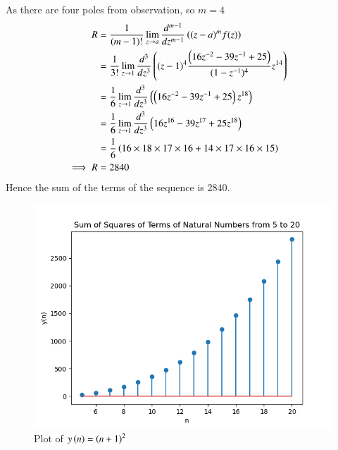 \documentclass[journal,12pt,twocolumn]{IEEEtran}
\theoremstyle{remark}
\begin{document}
As there are four poles from observation, so $m=4$
\begin{align}
    R &= \frac{1}{(m-1)!} \lim_{z \to a} \frac{d^{m-1}}{dz^{m-1}}\left((z-a)^mf(z)\right)\\
    &= \frac{1}{3!} \lim_{z \to 1} \frac{d^{3}}{dz^{3}}\left((z-1)^4 \frac{\left(16z^{-2}-39z^{-1}+25\right)}{(1-z^{-1})^4} z^{14}\right)\\
    &= \frac{1}{6} \lim_{z \to 1} \frac{d^{3}}{dz^{3}}\left(\left(16z^{-2}-39z^{-1}+25\right)z^{18}\right)\\
    &= \frac{1}{6} \lim_{z \to 1} \frac{d^{3}}{dz^{3}}\left(16z^{16}-39z^{17}+25z^{18}\right)\\
    &= \frac{1}{6}  \left(16 \times 18 \times 17 \times 16+14 \times 17 \times 16 \times 15 \right)\\
    \implies R&=2840 &
\end{align}
Hence the sum of the terms of the sequence is 2840.
\begin{figure}[h]
    \centering

\includegraphics[width=\columnwidth]{fig/graph.png}

\begin{center}
    \caption{Plot of $y\left(n\right)=\left(n+1\right)^2$}
\end{center}
    
    \label{Sound Wave}
\end{figure}
\end{document}
